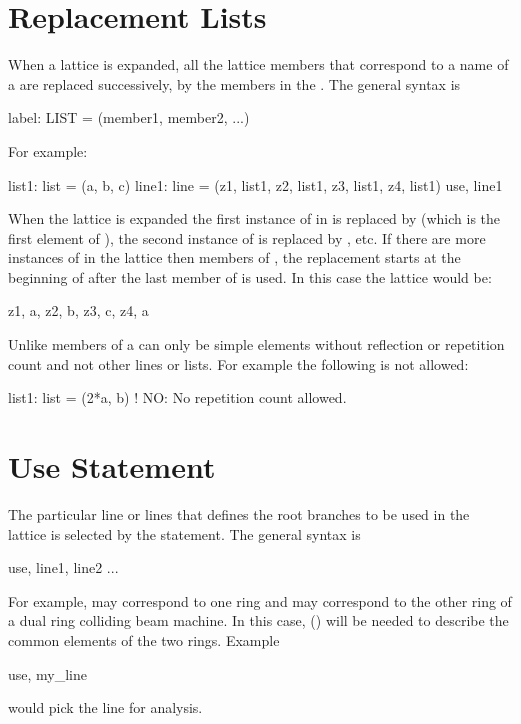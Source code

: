 \section{Replacement Lists}
\label{s:replace.list}

When a lattice is expanded, all the lattice members that correspond to
a name of a  are replaced successively, by the
members in the . The general syntax is
\begin{example}
  label: LIST = (member1, member2, ...)
\end{example}
For example:
\begin{example}
  list1: list = (a, b, c)
  line1: line = (z1, list1, z2, list1, z3, list1, z4, list1)
  use, line1
\end{example}
When the lattice is expanded the first instance of  in
 is replaced by  (which is the first element of
), the second instance of  is replaced by ,
etc. If there are more instances of  in the lattice then
members of , the replacement starts at the beginning of
 after the last member of  is used. In this case the
lattice would be:
\begin{example}
  z1, a, z2, b, z3, c, z4, a
\end{example}
Unlike \mad members of a  can only be simple elements 
without reflection or repetition count and not other lines or lists. 
For example the following is not allowed:
\begin{example}
  list1: list = (2*a, b)  ! NO: No repetition count allowed.
\end{example}

\section{Use Statement}
\label{s:use}

The particular line or lines that defines the root branches 
to be used in the lattice 
is selected by the  statement. The general syntax is
\begin{example}
  use, line1, line2 ...
\end{example}
For example,  may correspond to one ring and  may
correspond to the other ring of a dual ring colliding beam machine. In
this case,  () will be needed to
describe the common elements of the two rings. Example
\begin{example}
  use, my_line
\end{example}
would pick the line  for analysis. 

